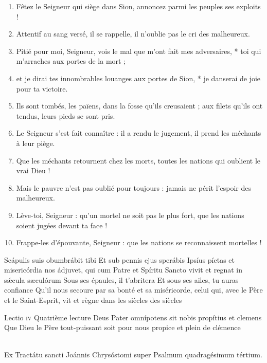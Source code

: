 \documentclass[twoside]{article}
\begin{document}
\begin{paracol}[1]{2}
\begin{enumerate}[wide, itemsep=0mm, labelwidth=!, labelindent=0pt, label=\color{gregoriocolor}\theenumi]
\item Fêtez le Seigneur qui siège dans Sion, annoncez parmi les peuples ses exploits !
\item Attentif au sang versé, il se rappelle, il n'oublie pas le cri des malheureux.
\item Pitié pour moi, Seigneur, vois le mal que m'ont fait mes adversaires, * toi qui m'arraches aux portes de la mort ;
\item et je dirai tes innombrables louanges aux portes de Sion, * je danserai de joie pour ta victoire.
\item Ils sont tombés, les païens, dans la fosse qu'ils creusaient ; aux filets qu'ils ont tendus, leurs pieds se sont pris.
\item Le Seigneur s'est fait connaître : il a rendu le jugement, il prend les méchants à leur piège.
\item Que les méchants retournent chez les morts, toutes les nations qui oublient le vrai Dieu !
\item Mais le pauvre n'est pas oublié pour toujours : jamais ne périt l'espoir des malheureux.
\item Lève-toi, Seigneur : qu'un mortel ne soit pas le plus fort, que les nations soient jugées devant ta face !
\item Frappe-les d'épouvante, Seigneur : que les nations se reconnaissent mortelles !
\end{enumerate}

\switchcolumn*

\versiculusabsolutio
	{Scápulis suis obumbrábit tibi}
	{Et sub pennis ejus sperábis}
	{Ipsíus píetas et misericórdia nos ádjuvet, qui cum Patre et Spíritu Sancto vivit et regnat in sǽcula sæculórum}
	{Sous ses épaules, il t’abritera}
	{Et sous ses ailes, tu auras confiance}
	{Qu'il nous secoure par sa bonté et sa miséricorde, celui qui, avec le Père et le Saint-Esprit, vit et règne dans les siècles des siècles}

\lectioresponsorium
	{Lectio \textsc{iv}}
	{Quatrième lecture}
	{Deus Pater omnípotens sit nobis propítius et clemens}
	{Que Dieu le Père tout-puissant soit pour nous propice et plein de clémence}
	{
		~\\Ex Tractátu sancti Joánnis Chrysóstomi super Psalmum quadragésimum tértium.

}
\end{paracol}
\end{document}
